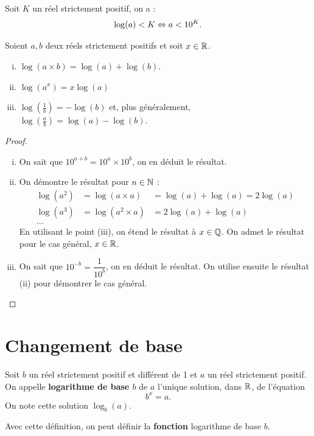 \documentclass[a4paper, 12pt]{report}
\begin{document}
\begin{prop}[Seuil]
Soit $K$ un réel strictement positif, on a :
\[ \log(a) < K \Leftrightarrow a < 10^K. \]
\end{prop}

\begin{prop}
Soient $a, b$ deux réels strictement positifs et soit $x \in \mathbb{R}$.
\begin{enumerate}[(i)]
\item $\log(a \times b) = \log(a) + \log(b)$.
\item $\log(a^x)=x \log(a)$
\item $\log(\frac1{b})= - \log(b)$ et, plus généralement, $\log \left ( \frac{a}{b} \right ) = \log(a) - \log(b)$.
\end{enumerate}
\end{prop}

\begin{proof}
\begin{enumerate}[(i)]
\item On sait que $10^{a+b} = 10^{a} \times 10^b$, on en déduit le résultat.
\item On démontre le résultat pour $n \in \mathbb{N}$ : 
\begin{align*}
\log(a^2) & = \log(a \times a) & = \log(a) + \log(a) = 2 \log(a) \\
\log(a^3) & = \log(a^2 \times a) & = 2 \log(a) + \log(a) \\
\dots
\end{align*}
En utilisant le point (iii), on étend le résultat à $x \in \mathbb{Q}$. On admet le résultat pour le cas général, $x \in \mathbb{R}$.
\item On sait que $10^{-b} = \dfrac1{10^b}$, on en déduit le résultat. On utilise ensuite le résultat (ii) pour démontrer le cas général.
\end{enumerate}
\end{proof}

\section{Changement de base}

\begin{defn}
Soit $b$ un réel strictement positif et différent de 1 et $a$ un réel strictement positif. On appelle \textbf{logarithme de base $b$} de $a$ l'unique solution, dans $\mathbb{R}$, de l'équation 
\[ b^x = a . \]
On note cette solution $\log_b(a)$.
\end{defn}

\begin{rmq}
Avec cette définition, on peut définir la \textbf{fonction} logarithme de base $b$.
\end{rmq}
\end{document}
